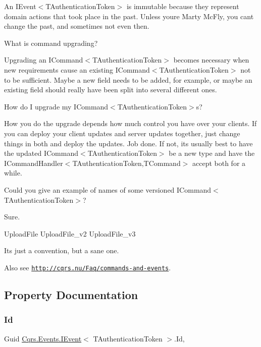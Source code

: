 An I\+Event$<$\+T\+Authentication\+Token$>$ is immutable because they represent domain actions that took place in the past. Unless you\textquotesingle{}re Marty Mc\+Fly, you can\textquotesingle{}t change the past, and sometimes not even then.

What is command upgrading?

Upgrading an I\+Command$<$\+T\+Authentication\+Token$>$ becomes necessary when new requirements cause an existing I\+Command$<$\+T\+Authentication\+Token$>$ not to be sufficient. Maybe a new field needs to be added, for example, or maybe an existing field should really have been split into several different ones.

How do I upgrade my I\+Command$<$\+T\+Authentication\+Token$>$s?

How you do the upgrade depends how much control you have over your clients. If you can deploy your client updates and server updates together, just change things in both and deploy the updates. Job done. If not, it\textquotesingle{}s usually best to have the updated I\+Command$<$\+T\+Authentication\+Token$>$ be a new type and have the I\+Command\+Handler$<$\+T\+Authentication\+Token,\+T\+Command$>$ accept both for a while.

Could you give an example of names of some versioned I\+Command$<$\+T\+Authentication\+Token$>$?

Sure.

Upload\+File Upload\+File\+\_\+v2 Upload\+File\+\_\+v3

It\textquotesingle{}s just a convention, but a sane one. 

 Also see \href{http://cqrs.nu/Faq/commands-and-events}{\tt http\+://cqrs.\+nu/\+Faq/commands-\/and-\/events}. 

\subsection{Property Documentation}
\mbox{\label{interfaceCqrs_1_1Events_1_1IEvent_a2974e13d307c62c5cc438d668ff1783b_a2974e13d307c62c5cc438d668ff1783b}} 
\subsubsection{\texorpdfstring{Id}{Id}}
{\footnotesize\ttfamily Guid \hyperlink{interfaceCqrs_1_1Events_1_1IEvent}{Cqrs.\+Events.\+I\+Event}$<$ T\+Authentication\+Token $>$.Id\hspace{0.3cm}{\ttfamily [get]}, {\ttfamily [set]}}

